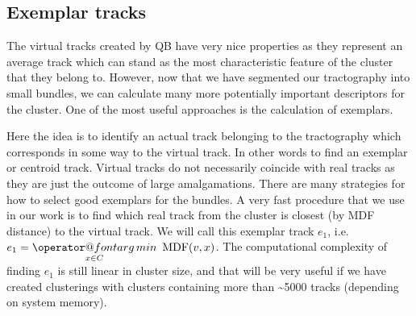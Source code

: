 \documentclass[preprint,authoryear,a4paper,10pt,onecolumn]{elsarticle}
\makeatletter
\def\argmin{\mathop{\operator@font arg\,min}}
\makeatother
\begin{document}

\subsection{Exemplar tracks\label{sub:exemplars}}

The virtual tracks created by QB have very nice properties as they
represent an average track which can stand as the most characteristic
feature of the cluster that they belong to. However, now that we have
segmented our tractography into small bundles, we can calculate many more
potentially important descriptors for the cluster. One of the most
useful approaches is the calculation of exemplars.

Here the idea is to identify an actual track belonging to the
tractography which corresponds in some way to the virtual track. In
other words to find an exemplar or centroid track. Virtual tracks do not
necessarily coincide with real tracks as they are just the outcome of
large amalgamations. There are many strategies for how to select good
exemplars for the bundles. A very fast procedure that we use in our
work is to find which real track from the cluster is closest (by MDF
distance) to the virtual track. We will call this exemplar track $e_{1}$,
i.e.~$e_{1}={\displaystyle \argmin_{x\in C}}\textrm{\,\ MDF}(v,x)$.
The computational complexity of finding $e_{1}$ is still linear in
cluster size, and that will be very useful if we have created
clusterings with clusters containing more than \textasciitilde5000 tracks
(depending on system memory).
\end{document}
